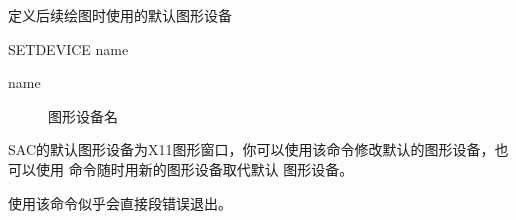\label{cmd:setdevice}

定义后续绘图时使用的默认图形设备

\begin{SACSTX}
SETDEVICE name
\end{SACSTX}

\begin{description}
\item [name] 图形设备名
\end{description}

SAC的默认图形设备为X11图形窗口，你可以使用该命令修改默认的图形设备，也
可以使用  命令随时用新的图形设备取代默认
图形设备。

使用该命令似乎会直接段错误退出。
